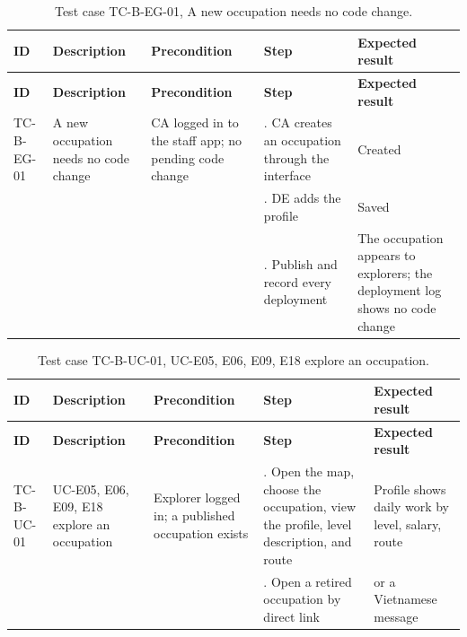 {\small
\begin{longtable}{|>{\raggedright\arraybackslash}p{}|>{\raggedright\arraybackslash}p{}|>{\raggedright\arraybackslash}p{}|>{\raggedright\arraybackslash}p{}|>{\raggedright\arraybackslash}p{}|}
\caption{Test case TC-B-EG-01, A new occupation needs no code change.} \\
\hline
\textbf{ID} & \textbf{Description} & \textbf{Precondition} & \textbf{Step} & \textbf{Expected result} \\ \hline
\endfirsthead
\hline
\textbf{ID} & \textbf{Description} & \textbf{Precondition} & \textbf{Step} & \textbf{Expected result} \\ \hline
\endhead
TC-B-EG-01 & A new occupation needs no code change & CA logged in to the staff app; no pending code change & 1. CA creates an occupation through the interface & Created \\ \hline
 &  &  & 2. DE adds the profile & Saved \\ \hline
 &  &  & 3. Publish and record every deployment & The occupation appears to explorers; the deployment log shows no code change \\ \hline
\end{longtable}
}

{\small
\begin{longtable}{|>{\raggedright\arraybackslash}p{}|>{\raggedright\arraybackslash}p{}|>{\raggedright\arraybackslash}p{}|>{\raggedright\arraybackslash}p{}|>{\raggedright\arraybackslash}p{}|}
\caption{Test case TC-B-UC-01, UC-E05, E06, E09, E18 explore an occupation.} \\
\hline
\textbf{ID} & \textbf{Description} & \textbf{Precondition} & \textbf{Step} & \textbf{Expected result} \\ \hline
\endfirsthead
\hline
\textbf{ID} & \textbf{Description} & \textbf{Precondition} & \textbf{Step} & \textbf{Expected result} \\ \hline
\endhead
TC-B-UC-01 & UC-E05, E06, E09, E18 explore an occupation & Explorer logged in; a published occupation exists & 1. Open the map, choose the occupation, view the profile, level description, and route & Profile shows daily work by level, salary, route \\ \hline
 &  &  & 2. Open a retired occupation by direct link & 404 or a Vietnamese message \\ \hline
\end{longtable}
}

